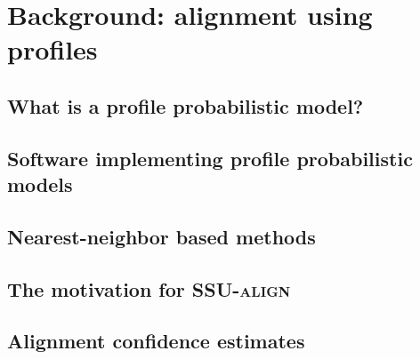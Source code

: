 \section{Background: alignment using profiles}

\subsection{What is a profile probabilistic model?}

\begin{comment}
Profile probabilistic models are statistical models of a sequence
family that include \emph{position-specific} information about which
residues are 

For our purposes here it is 

Examples include profile hidden Markov models, commonly used
for protein sequence homology search and implemented in some widely
used software packages such as \software{HMMER} (CITE). 
\end{comment}

\subsection{Software implementing profile probabilistic models}

\subsection{Nearest-neighbor based methods}

\subsection{The motivation for \textsc{SSU-align}}

\subsection{Alignment confidence estimates}

